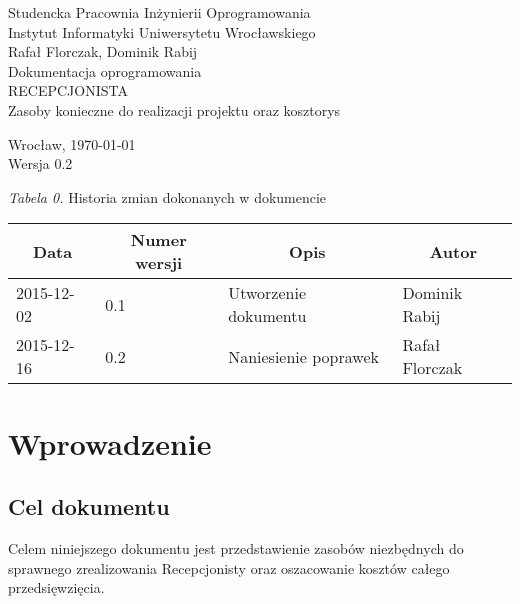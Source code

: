 \documentclass [11pt, a4paper, leqno] {article}
\begin{document}

\begin{center}
  \thispagestyle{empty} %
  {\large Studencka Pracownia Inżynierii Oprogramowania} \\ [0.5cm]
	{\large Instytut Informatyki Uniwersytetu Wrocławskiego} \\ [6.0cm]

  {\large Rafał Florczak, Dominik Rabij} \\ [1.5cm]

	{\huge Dokumentacja oprogramowania} \\ [0.5cm]
  {\huge RECEPCJONISTA} \\ [1.5cm]

  {\large Zasoby konieczne do realizacji projektu oraz kosztorys} \\ [0.5cm]

  \vfill
  
  {\large Wrocław, \today} \\ [0.5cm]
  {\large Wersja 0.2}
\end{center}

\newpage


\textit{Tabela 0.} Historia zmian dokonanych w dokumencie

\begin{center}
  \begin{tabular}{| l | l | l | l |}
    \hline
    \multicolumn{1}{|c|}{Data} & 
    \multicolumn{1}{|c|}{Numer wersji} &  
    \multicolumn{1}{|c|}{Opis} &
    \multicolumn{1}{|c|}{Autor} \\ \hline \hline
    2015-12-02 & 0.1 & Utworzenie dokumentu & Dominik Rabij \\ \hline
    2015-12-16 & 0.2 & Naniesienie poprawek & Rafał Florczak \\ \hline
  \end{tabular}
\end{center}

\medskip

\tableofcontents

\newpage

\section{Wprowadzenie}

\subsection{Cel dokumentu}
\noindent
Celem niniejszego dokumentu jest przedstawienie zasobów niezbędnych do sprawnego zrealizowania Recepcjonisty oraz oszacowanie kosztów całego przedsięwzięcia. 
\end{document}
